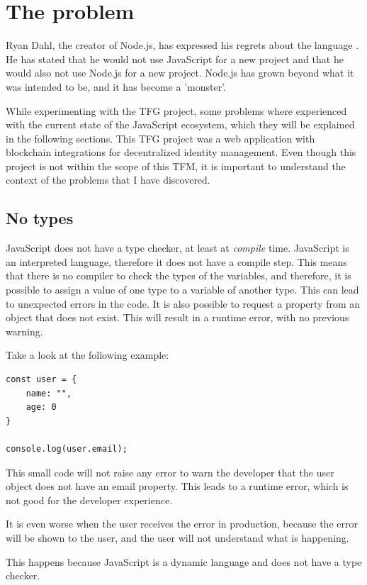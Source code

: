 \documentclass[10pt,journal,compsoc]{IEEEtran}
\begin{document}
\section{The problem}

Ryan Dahl, the creator of Node.js, has expressed his regrets about the language \cite{FKNODE}. He has stated that he would not use JavaScript for a new project and that he would also not use Node.js for a new project. Node.js has grown beyond what it was intended to be, and it has become a 'monster'.

While experimenting with the TFG \cite{TFG} project, some problems where experienced with the current state of the JavaScript ecosystem, which they will be explained in the following sections. This TFG project was a web application with blockchain integrations for decentralized identity management. Even though this project is not within the scope of this TFM, it is important to understand the context of the problems that I have discovered.

\subsection{No types}
JavaScript does not have a type checker, at least at \textit{compile} time. JavaScript is an interpreted language, therefore it does not have a compile step. This means that there is no compiler to check the types of the variables, and therefore, it is possible to assign a value of one type to a variable of another type. This can lead to unexpected errors in the code. It is also possible to request a property from an object that does not exist. This will result in a runtime error, with no previous warning.

Take a look at the following example:
\begin{lstlisting}
const user = {
    name: "",
    age: 0
}
    
console.log(user.email);
\end{lstlisting}

This small code will not raise any error to warn the developer that the user object does not have an email property. This leads to a runtime error, which is not good for the developer experience.

It is even worse when the user receives the error in production, because the error will be shown to the user, and the user will not understand what is happening.

This happens because JavaScript is a dynamic language and does not have a type checker.
\end{document}
